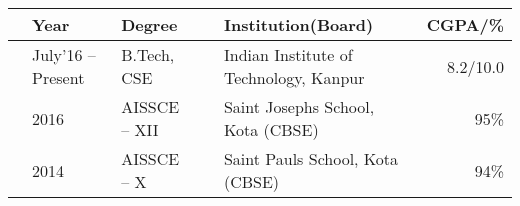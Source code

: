 
\newcommand{\education}[4]{
  & #1 & #2 & &#3 & #4
}


\begin{tabular}{ | L{0.05cm} l | L{3cm} | L{0.05cm} C{8cm} | r |}
  \hline
  \education{\textbf{Year}}{\textbf{Degree}}{\textbf{Institution(Board)}}{\textbf{CGPA/\%}}\\
  \hline
  \education{July'16 -- Present}{B.Tech, CSE}{Indian Institute of Technology, Kanpur}{8.2/10.0}\\
  \education{2016}{AISSCE -- XII}{Saint Josephs School, Kota (CBSE)}{95\%}\\
  \education{2014}{AISSCE -- X}{Saint Pauls School, Kota (CBSE)}{94\%}\\
  \hline
\end{tabular}

